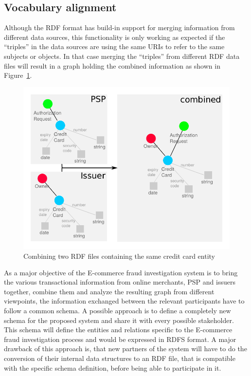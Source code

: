 \subsection{Vocabulary alignment}
\label{subsec:vocab_align}

Although the \gls{RDF} format has build-in support for merging information from different data sources, this functionality is only working as expected if the ``triples'' in the data sources are using the same \gls{URI}s to refer to the same subjects or objects. In that case merging the ``triples'' from different \gls{RDF} data files will result in a graph holding the combined information as shown in Figure~\ref{fig:images_combine_rdf_graph}.\@

\begin{figure}[H]
	\centering
		\includegraphics[width=0.9\columnwidth]{images/combine_rdf_graph.pdf}
	\caption{Combining two \gls{RDF} files containing the same credit card entity}
\label{fig:images_combine_rdf_graph}
\end{figure}

As a major objective of the \gls{E-commerce} fraud investigation system is to bring the various transactional information from online merchants, \gls{PSP} and issuers together, combine them and analyze the resulting graph from different viewpoints, the information exchanged between the relevant participants have to follow a common schema. A possible approach is to define a completely new schema for the proposed system and share it with every possible stakeholder. This schema will define the entities and relations specific to the \gls{E-commerce} fraud investigation process and would be expressed in \gls{RDFS} format. A major drawback of this approach is, that new partners of the system will have to do the conversion of their internal data structures to an \gls{RDF} file, that is compatible with the specific schema definition, before being able to participate in it. \\

